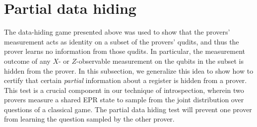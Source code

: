 \documentclass[11pt]{article}
\begin{document}
\section{Partial data hiding}\label{sec:rotated-data-hiding}

The data-hiding game presented above was used to show that the
provers' measurement acts as identity on a subset of the provers'
qudits, and thus the prover learns no information from those
qudits. In particular, the measurement outcome of any $X$- or
$Z$-observable measurement on the qubits in the subset is hidden from
the prover. In this subsection, we generalize this idea to show how
to certify that certain \emph{partial} information about a register is hidden
from a prover. This test is a crucial component in our technique of
introspection, wherein two provers measure a shared EPR state to
sample from the joint distribution over questions of a classical
game. The partial data hiding test will prevent one prover from
learning the question sampled by the other prover.
\end{document}

